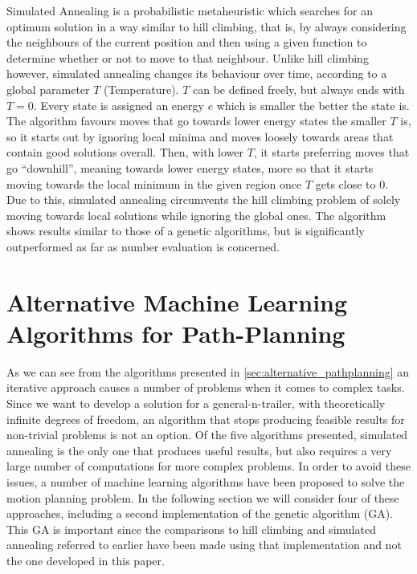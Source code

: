 Simulated Annealing is a probabilistic metaheuristic which searches for an optimum solution in a way similar to hill climbing, that is, by always considering the neighbours of the current position and then using a given function to determine whether or not to move to that neighbour. Unlike hill climbing however, simulated annealing changes its behaviour over time, according to a global parameter $T$ (Temperature). $T$ can be defined freely, but always ends with $T=0$. Every state is assigned an energy $e$ which is smaller the better the state is. The algorithm favours moves that go towards lower energy states the smaller $T$ is, so it starts out by ignoring local minima and moves loosely towards areas that contain good solutions overall. Then, with lower $T$, it starts preferring moves that go "`downhill"', meaning towards lower energy states, more so that it starts moving towards the local minimum in the given region once $T$ gets close to $0$. Due to this, simulated annealing circumvents the hill climbing problem of solely moving towards local solutions while ignoring the global ones. The algorithm shows results similar to those of a genetic algorithms, but is significantly outperformed as far as number evaluation is concerned.\cite{8}


\section{Alternative Machine Learning Algorithms for Path-Planning}
\label{sec:alternative_machine_learning_pathplanning}

As we can see from the algorithms presented in \ref{sec:alternative_pathplanning} an iterative approach causes a number of problems when it comes to complex tasks. Since we want to develop a solution for a general-n-trailer, with theoretically infinite degrees of freedom, an algorithm that stops producing feasible results for non-trivial problems is not an option. Of the five algorithms presented, simulated annealing is the only one that produces useful results, but also requires a very large number of computations \cite{8} for more complex problems. In order to avoid these issues, a number of machine learning algorithms have been proposed to solve the motion planning problem. In the following section we will consider four of these approaches, including a second implementation of the genetic algorithm (GA). This GA is important since the comparisons to hill climbing and simulated annealing referred to earlier have been made using that implementation and not the one developed in this paper. \cite{8}

